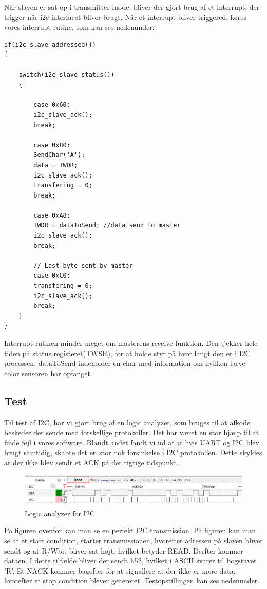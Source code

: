 Når slaven er sat op i transmitter mode, bliver der gjort brug af et interrupt, der trigger når i2c interfacet bliver brugt. Når et interrupt bliver triggered, køres vores interrupt rutine, som kan ses nedenunder:

\begin{lstlisting}
if(i2c_slave_addressed())
{
	
	switch(i2c_slave_status())
	{
		
		case 0x60:
		i2c_slave_ack();
		break;
		
		case 0x80:
		SendChar('A');
		data = TWDR;
		i2c_slave_ack();
		transfering = 0;
		break;
		
		case 0xA8:
		TWDR = dataToSend; //data send to master
		i2c_slave_ack();
		break;
		
		// Last byte sent by master
		case 0xC0:
		transfering = 0;
		i2c_slave_ack();
		break;
	}
}
\end{lstlisting}

Interrupt rutinen minder meget om masterens receive funktion. Den tjekker hele tiden på status registeret(TWSR), for at holde styr på hvor langt den er i I2C processen. dataToSend indeholder en char med information om hvilken farve color sensoren har opfanget. 

\subsection{Test}
Til test af I2C, har vi gjort brug af en logic analyzer, som bruges til at afkode beskeder der sende med forskellige protokoller. Det har været en stor hjælp til at finde fejl i vores software. Blandt andet fandt vi ud af at hvis UART og I2C blev brugt samtidig, skabte det en stor nok forsinkelse i I2C protokollen. Dette skyldes at der ikke blev sendt et ACK på det rigtige tidspunkt. 

\begin{figure}[H]
	\centering
	\includegraphics[width = 450pt]{Img/I2C_logic.png}
	\caption{Logic analyzer for I2C}
	\label{fig:I2C_Logic}
\end{figure}

På figuren ovenfor kan man se en perfekt I2C transmission. På figuren kan man se at et start condition, starter transmissionen, hvorefter adressen på slaven bliver sendt og at R/Wbit bliver sat højt, hvilket betyder READ. Derfter kommer dataen. I dette tilfælde bliver der sendt h52, hvilket i ASCII svarer til bogstavet 'R'. Et NACK kommer bagefter for at signallere at der ikke er mere data, hvorefter et stop condition blever genereret. Testopstillingen kan ses nedenunder.

